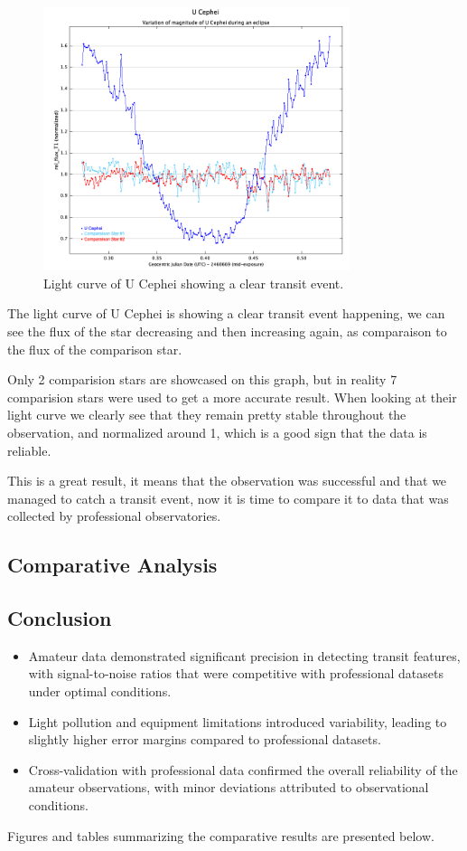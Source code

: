 \documentclass[12pt,a4paper]{article}
\begin{document}
\begin{figure}[h]
    \centering
    \includegraphics[width=0.8\textwidth]{imgs/light-curve.png}
    \caption{Light curve of U Cephei showing a clear transit event.}
    \label{fig:light_curve}
\end{figure}

The light curve of U Cephei is showing a clear transit event happening, we can see the flux of the star decreasing and then increasing again, as comparaison to the flux of the comparison star.

Only 2 comparision stars are showcased on this graph, but in reality 7 comparision stars were used to get a more accurate result. When looking at their light curve we clearly see that they remain pretty stable throughout the observation,
and normalized around 1, which is a good sign that the data is reliable.

This is a great result, it means that the observation was successful and that we managed to catch a transit event, now it is time to compare it to data that was collected by professional observatories.

\subsection{Comparative Analysis}


\subsection{Conclusion}

\begin{itemize}
    \item Amateur data demonstrated significant precision in detecting transit features, with signal-to-noise ratios that were competitive with professional datasets under optimal conditions.
    \item Light pollution and equipment limitations introduced variability, leading to slightly higher error margins compared to professional datasets.
    \item Cross-validation with professional data confirmed the overall reliability of the amateur observations, with minor deviations attributed to observational conditions.
\end{itemize}
Figures and tables summarizing the comparative results are presented below.
\end{document}
